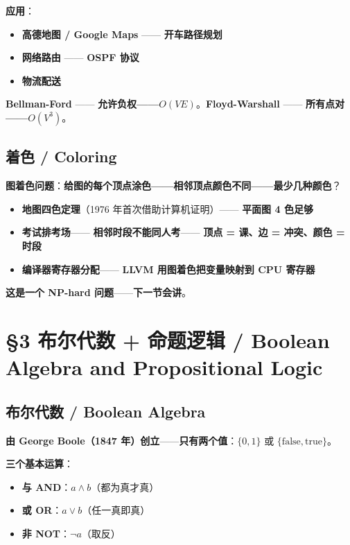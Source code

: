 \textbf{应用}：

\begin{itemize}
\item \textbf{高德地图 / Google Maps} —— \textbf{开车路径规划}
\item \textbf{网络路由} —— \textbf{OSPF 协议}
\item \textbf{物流配送}
\end{itemize}

\textbf{Bellman-Ford} —— \textbf{允许负权——\textbf{$O(VE)$}}。\textbf{Floyd-Warshall} —— \textbf{所有点对——\textbf{$O(V^3)$}}。

\subsection{着色 / Coloring}

\textbf{图着色问题}：\textbf{给图的每个顶点涂色——\textbf{相邻顶点颜色不同}——\textbf{最少几种颜色}}？

\begin{itemize}
\item \textbf{地图四色定理}（1976 年首次借助计算机证明）—— \textbf{平面图 4 色足够}
\item \textbf{考试排考场}—— \textbf{相邻时段不能同人考}—— \textbf{顶点 = 课、边 = 冲突、颜色 = 时段}
\item \textbf{编译器寄存器分配}—— \textbf{LLVM 用图着色把变量映射到 CPU 寄存器}
\end{itemize}

\textbf{这是一个 NP-hard 问题}——\textbf{下一节会讲}。

\section{§3 布尔代数 + 命题逻辑 / Boolean Algebra and Propositional Logic}

\subsection{布尔代数 / Boolean Algebra}

\textbf{由 George Boole（1847 年）创立}——\textbf{只有两个值}：$\{0, 1\}$ 或 $\{\text{false}, \text{true}\}$。

\textbf{三个基本运算}：

\begin{itemize}
\item \textbf{与 AND}：$a \land b$（都为真才真）
\item \textbf{或 OR}：$a \lor b$（任一真即真）
\item \textbf{非 NOT}：$\neg a$（取反）
\end{itemize}

